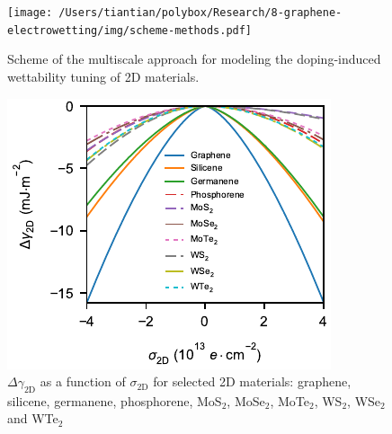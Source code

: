 \documentclass[journal=jacsat,manuscript=article,email=true,hyperref=true,keywords=true]{achemso}
\begin{document}
\begin{figure}[htbp]
\centering
\texttt{[image: /Users/tiantian/polybox/Research/8-graphene-electrowetting/img/scheme-methods.pdf]}
\caption{\label{fig:scheme-method}
Scheme of the multiscale approach for modeling the doping-induced wettability tuning of 2D materials.}
\end{figure}


\begin{figure}[htbp]
\centering
\includegraphics[width=0.95\linewidth]{../img/dgamma-sigma.pdf}
\caption{\label{fig:dgamma-sigma}
\(\Delta \gamma_{\mathrm{2D}}\) as a function of \(\sigma_{\mathrm{2D}}\) for selected 2D materials: graphene, silicene, germanene, phosphorene, MoS\(_{2}\), MoSe\(_{2}\), MoTe\(_{2}\), WS\(_{2}\), WSe\(_{2}\) and WTe\(_{2}\)}
\end{figure}
\end{document}

